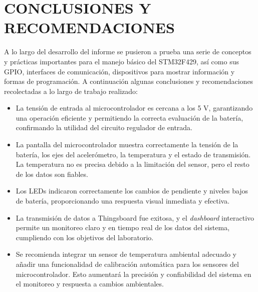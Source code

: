 \newpage
\section{CONCLUSIONES Y RECOMENDACIONES}
A lo largo del desarrollo del informe se pusieron a prueba una serie de conceptos y prácticas importantes para el manejo básico del STM32F429, así como sus GPIO, interfaces de comunicación, dispositivos para mostrar información y formas de programación. A continuación algunas conclusiones y recomendaciones recolectadas a lo largo de trabajo realizado: 

\begin{itemize}
    \item La tensión de entrada al microcontrolador es cercana a los 5 V, garantizando una operación eficiente y permitiendo la correcta evaluación de la batería, confirmando la utilidad del circuito regulador de entrada. 

    \item La pantalla del microcontrolador muestra correctamente la tensión de la batería, los ejes del acelerómetro, la temperatura y el estado de transmisión. La temperatura no es precisa debido a la limitación del sensor, pero el resto de los datos son fiables.

    \item Los LEDs indicaron correctamente los cambios de pendiente y niveles bajos de batería, proporcionando una respuesta visual inmediata y efectiva.

    \item La transmisión de datos a Thingsboard fue exitosa, y el \textit{dashboard} interactivo permite un monitoreo claro y en tiempo real de los datos del sistema, cumpliendo con los objetivos del laboratorio.

    \item Se recomienda integrar un sensor de temperatura ambiental adecuado y añadir una funcionalidad de calibración automática para los sensores del microcontrolador. Esto aumentará la precisión y confiabilidad del sistema en el monitoreo y respuesta a cambios ambientales.
\end{itemize} 